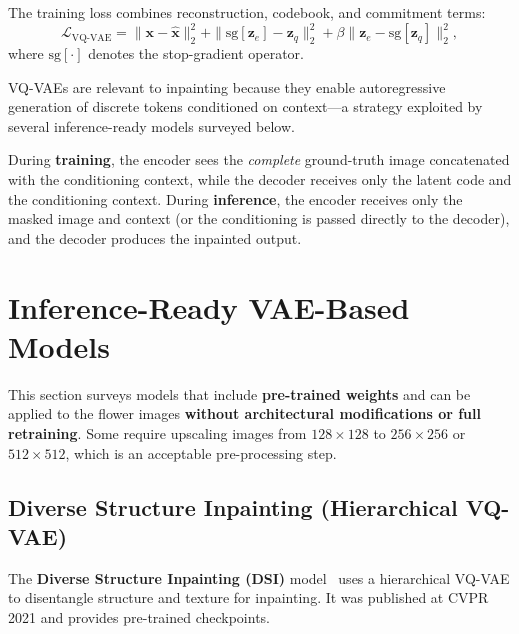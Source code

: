 \documentclass[11pt, a4paper]{article}
\newcommand{\loss}{\mathcal{L}}
\begin{document}
The training loss combines reconstruction, codebook, and commitment terms:
\begin{equation}
  \loss_{\text{VQ-VAE}} = \| \mathbf{x} - \hat{\mathbf{x}} \|_2^2 + \| \mathrm{sg}[\mathbf{z}_e] - \mathbf{z}_q \|_2^2 + \beta \| \mathbf{z}_e - \mathrm{sg}[\mathbf{z}_q] \|_2^2,
  \label{eq:vqvae_loss}
\end{equation}
where $\mathrm{sg}[\cdot]$ denotes the stop-gradient operator.

VQ-VAEs are relevant to inpainting because they enable autoregressive generation of discrete tokens conditioned on context---a strategy exploited by several inference-ready models surveyed below.

\begin{notebox}
During \textbf{training}, the encoder sees the \emph{complete} ground-truth image concatenated with the conditioning context, while the decoder receives only the latent code and the conditioning context. During \textbf{inference}, the encoder receives only the masked image and context (or the conditioning is passed directly to the decoder), and the decoder produces the inpainted output.
\end{notebox}


\section{Inference-Ready VAE-Based Models}
\label{sec:ready}

This section surveys models that include \textbf{pre-trained weights} and can be applied to the flower images \textbf{without architectural modifications or full retraining}. Some require upscaling images from \(128 \times 128\) to \(256 \times 256\) or \(512 \times 512\), which is an acceptable pre-processing step.




\subsection{Diverse Structure Inpainting (Hierarchical VQ-VAE)}
\label{sec:dsi}

The \textbf{Diverse Structure Inpainting (DSI)} model~\cite{peng2021diverse} uses a hierarchical VQ-VAE to disentangle structure and texture for inpainting. It was published at CVPR 2021 and provides pre-trained checkpoints.
\end{document}
